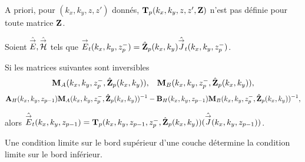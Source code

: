     A priori, pour \((k_x,k_y,z,z')\) donnés, \(\mathbf{T}_p(k_x,k_y,z,z',\mathbf{Z})\) n'est pas définie pour toute matrice \(\mathbf{Z}\).

    \begin{prop}%
      \label{prop:plan:transfert:impedance}

      Soient \(\hat{{\overset{\rightarrow}{E}}},\hat{{\overset{\rightarrow}{\mathcal{H}}}}\) tels que \({\overset{\rightarrow}{E}}_t(k_x,k_y,z_p^-) = \hat{\mathbf{Z}}_{p}(k_x,k_y)\hat{{\overset{\rightarrow}{J}}}_t(k_x,k_y,z_p^-)\).

      Si les matrices suivantes sont inversibles
      \begin{align*}
        \mathbf{M}_{A}(k_x,k_y,z_p^-, \hat{\mathbf{Z}}_{p}(k_x,k_y)), && \mathbf{M}_{B}(k_x,k_y,z_p^-, \hat{\mathbf{Z}}_{p}(k_x,k_y)),
      \end{align*}
      \begin{align*}
        \mathbf{A}_{H}(k_x,k_y,z_{p-1})\mathbf{M}_{A}(k_x,k_y,z_p^-, \hat{\mathbf{Z}}_{p}(k_x,k_y))^{-1} - \mathbf{B}_{H}(k_x,k_y,z_{p-1})\mathbf{M}_{B}(k_x,k_y,z_p^-, \hat{\mathbf{Z}}_{p}(k_x,k_y))^{-1},
      \end{align*}

      alors \(\hat{{\overset{\rightarrow}{E}}}_t(k_x,k_y,z_{p-1}) = \mathbf{T}_p(k_x,k_y,z_{p-1},z_p^-,\hat{\mathbf{Z}}_{p}(k_x,k_y))(\hat{{\overset{\rightarrow}{J}}}(k_x,k_y,z_{p-1}))\).

      Une condition limite sur le bord supérieur d'une couche détermine la condition limite sur le bord inférieur.
    \end{prop}


